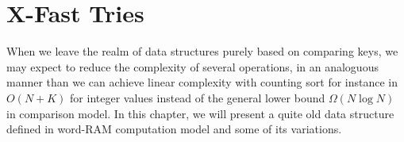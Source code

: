 
\chapter{X-Fast Tries}\label{XFastTrie}

When we leave the realm of data structures purely based on comparing keys, we may expect to reduce the complexity of several operations, in an analoguous manner than we can achieve linear complexity with counting sort for instance in $O(N + K)$ for integer values instead of the general lower bound $\Omega(N \log N)$ in comparison model. In this chapter, we will present a quite old data structure defined in word-RAM computation model and some of its variations.





